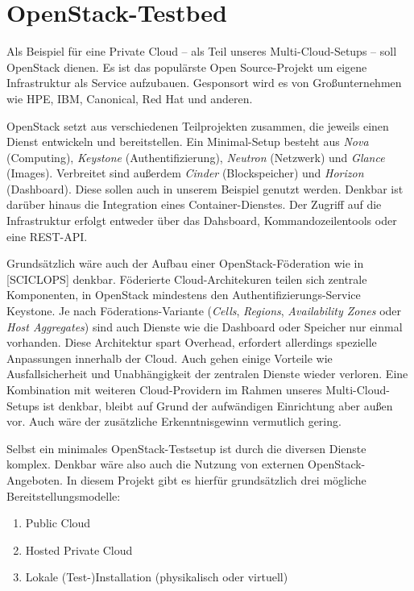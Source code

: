 \section{OpenStack-Testbed}

Als Beispiel für eine Private Cloud -- als Teil unseres Multi-Cloud-Setups -- soll OpenStack dienen. Es ist das populärste Open Source-Projekt um eigene Infrastruktur als Service aufzubauen. Gesponsort wird es von Großunternehmen wie HPE, IBM, Canonical, Red Hat und anderen.

OpenStack setzt aus verschiedenen Teilprojekten zusammen, die jeweils einen Dienst entwickeln und bereitstellen. Ein Minimal-Setup besteht aus \emph{Nova} (Computing), \emph{Key\-stone} (Authentifizierung), \emph{Neutron} (Netzwerk) und \emph{Glance} (Images). Verbreitet sind außerdem \emph{Cinder} (Blockspeicher) und \emph{Horizon} (Dash\-board). Diese sollen auch in unserem Beispiel genutzt werden. Denkbar ist darüber hinaus die Integration eines Container-Dienstes. Der Zugriff auf die Infrastruktur erfolgt entweder über das Dahsboard, Kommandozeilentools oder eine REST-API.

Grundsätzlich wäre auch der Aufbau einer OpenStack-Föderation wie in [SCICLOPS] denkbar. Föderierte Cloud-Architekuren teilen sich zentrale Komponenten, in OpenStack mindestens den Authentifizierungs-Service Keystone. Je nach Föderations-Variante (\emph{Cells}, \emph{Regions}, \emph{Availability Zones} oder \emph{Host Aggregates}) sind auch Dienste wie die Dashboard oder Speicher nur einmal vorhanden. Diese Architektur spart Overhead, erfordert allerdings spezielle Anpassungen innerhalb der Cloud. Auch gehen einige Vorteile wie Ausfallsicherheit und Unabhängigkeit der zentralen Dienste wieder verloren. Eine Kombination mit weiteren Cloud-Providern im Rahmen unseres Multi-Cloud-Setups ist denkbar, bleibt auf Grund der aufwändigen Einrichtung aber außen vor. Auch wäre der zusätzliche Erkenntnisgewinn vermutlich gering.

Selbst ein minimales OpenStack-Testsetup ist durch die diversen Dienste komplex. Denkbar wäre also auch die Nutzung von externen OpenStack-Angeboten. In diesem Projekt gibt es hierfür grundsätzlich drei mögliche Bereitstellungsmodelle:

\begin{enumerate}
	\item Public Cloud
	\item Hosted Private Cloud
	\item Lokale (Test-)Installation (physikalisch oder virtuell)
\end{enumerate}


